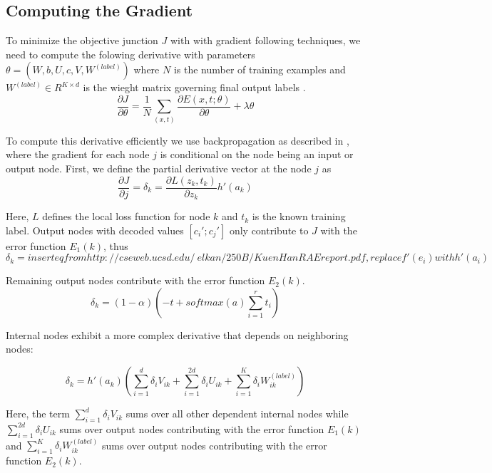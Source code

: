 \documentclass{article}
\begin{document}
%
%
\subsection{Computing the Gradient}
To minimize the objective junction $J$ with with gradient following techniques, we need to compute the folowing derivative with parameters $\theta = (W, b, U, c, V, W^{(label)})$ where $N$ is the number of training examples and $W^{(label)} \in R^{K \times d}$ is the wieght matrix governing final output labels \cite{Socher}.
\begin{equation}
    \frac{\partial J}{\partial \theta} = \frac{1}{N} \sum_{(x, t)} \frac{\partial E(x, t; \theta)}{\partial \theta} + \lambda \theta
\end{equation}

To compute this derivative efficiently we use backpropagation as described in \cite{CSE250B}, where the gradient for each node $j$ is conditional on the node being an input or output node. First, we define the partial derivative vector at the node $j$ as
\begin{equation}
    \frac{\partial J}{\partial j} = \delta_{k} = \frac{\partial L(z_k , t_k)}{\partial z_k} h'(a_k)
\end{equation}

Here, $L$ defines the local loss function for node $k$ and $t_k$ is the known training label. Output nodes with decoded values $[c_i' ; c_j']$ only contribute to $J$ with the error function $E_1(k)$, thus
\begin{equation}
    \delta_{k} = insert eq from http://cseweb.ucsd.edu/~elkan/250B/KuenHanRAEreport.pdf, replace f'(e_i) with h'(a_i)
\end{equation}

Remaining output nodes contribute with the error function $E_2(k)$.
\begin{equation}
    \delta_{k} = (1 - \alpha)(-t + softmax(a) \sum_{i=1}^r t_i )
\end{equation}

Internal nodes exhibit a more complex derivative that depends on neighboring nodes:

\begin{equation}
    \delta_{k} = h'(a_k)(\sum_{i=1}^d \delta_{i}V_{ik} + \sum_{i=1}^{2d} \delta_{i}U_{ik} + \sum_{i=1}^{K} \delta_{i} W^{(label)}_{ik})
\end{equation}

Here, the term $\sum_{i=1}^d \delta_{i}V_{ik}$ sums over all other dependent internal nodes while $\sum_{i=1}^{2d} \delta_{i}U_{ik}$ sums over output nodes contributing with the error function $E_1(k)$ and $\sum_{i=1}^{K} \delta_{i} W^{(label)}_{ik}$ sums over output nodes contributing with the error function $E_2(k)$.
%
%
\end{document}
